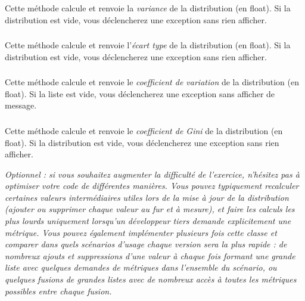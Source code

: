 \noindent Cette méthode calcule et renvoie la \textit{variance} de la distribution (en float).
Si la distribution est vide, vous déclencherez une exception  sans rien afficher.


\subsubsection*{}

\noindent Cette méthode calcule et renvoie l'\textit{écart type} de la distribution (en float).
Si la distribution est vide, vous déclencherez une exception  sans rien afficher.


\subsubsection*{}

\noindent Cette méthode calcule et renvoie le \textit{coefficient de variation} de la distribution (en float).
Si la liste est vide, vous déclencherez une exception  sans afficher de message.


\subsubsection*{}

\noindent Cette méthode calcule et renvoie le \textit{coefficient de Gini} de la distribution (en float).
Si la distribution est vide, vous déclencherez une exception  sans rien afficher.

\bigskip

\textit{Optionnel : si vous souhaitez augmenter la difficulté de l'exercice, n'hésitez pas à optimiser votre code de différentes manières.
Vous pouvez typiquement recalculer certaines valeurs intermédiaires utiles lors de la mise à jour de la distribution (ajouter ou supprimer chaque valeur au fur et à mesure), et faire les calculs les plus lourds uniquement lorsqu'un développeur tiers demande explicitement une métrique.
Vous pouvez également implémenter plusieurs fois cette classe et comparer dans quels scénarios d'usage chaque version sera la plus rapide : de nombreux ajouts et suppressions d'une valeur à chaque fois formant une grande liste avec quelques demandes de métriques dans l'ensemble du scénario, ou quelques fusions de grandes listes avec de nombreux accès à toutes les métriques possibles entre chaque fusion.}
